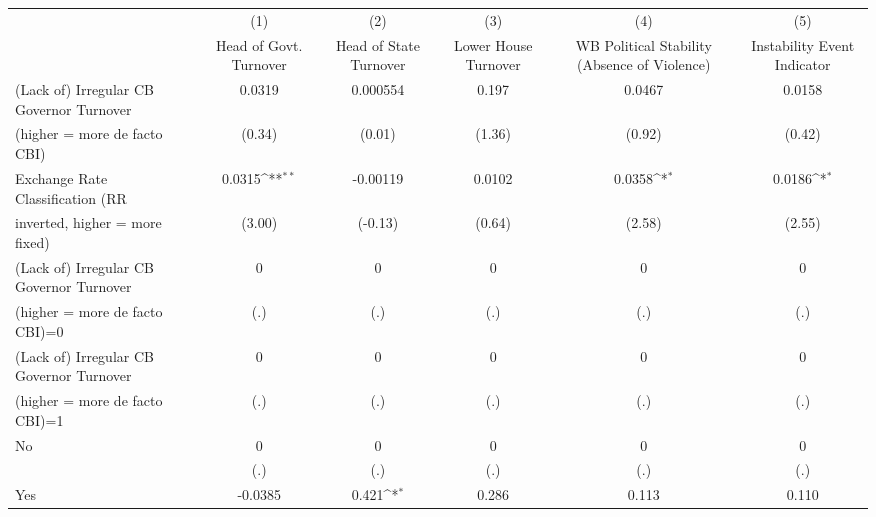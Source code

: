 {
\def\sym#1{\ifmmode^{#1}\else\(^{#1}\)\fi}
\begin{tabular}{l*{5}{c}}
\toprule
                                        &\multicolumn{1}{c}{(1)}&\multicolumn{1}{c}{(2)}&\multicolumn{1}{c}{(3)}&\multicolumn{1}{c}{(4)}&\multicolumn{1}{c}{(5)}\\
                                        &\multicolumn{1}{c}{Head of Govt. Turnover}&\multicolumn{1}{c}{Head of State Turnover}&\multicolumn{1}{c}{Lower House Turnover}&\multicolumn{1}{c}{WB Political Stability (Absence of Violence)}&\multicolumn{1}{c}{Instability Event Indicator}\\
\midrule
(Lack of) Irregular CB Governor Turnover&   0.0319         & 0.000554         &    0.197         &   0.0467         &   0.0158         \\
(higher = more de facto CBI)            &   (0.34)         &   (0.01)         &   (1.36)         &   (0.92)         &   (0.42)         \\
\addlinespace
Exchange Rate Classification (RR        &   0.0315\sym{**} & -0.00119         &   0.0102         &   0.0358\sym{*}  &   0.0186\sym{*}  \\
inverted, higher = more fixed)          &   (3.00)         &  (-0.13)         &   (0.64)         &   (2.58)         &   (2.55)         \\
\addlinespace
(Lack of) Irregular CB Governor Turnover&        0         &        0         &        0         &        0         &        0         \\
(higher = more de facto CBI)=0          &      (.)         &      (.)         &      (.)         &      (.)         &      (.)         \\
\addlinespace
(Lack of) Irregular CB Governor Turnover&        0         &        0         &        0         &        0         &        0         \\
(higher = more de facto CBI)=1          &      (.)         &      (.)         &      (.)         &      (.)         &      (.)         \\
\addlinespace
No                                      &        0         &        0         &        0         &        0         &        0         \\
                                        &      (.)         &      (.)         &      (.)         &      (.)         &      (.)         \\
\addlinespace
Yes                                     &  -0.0385         &    0.421\sym{*}  &    0.286         &    0.113         &    0.110         \\

\end{tabular}}
